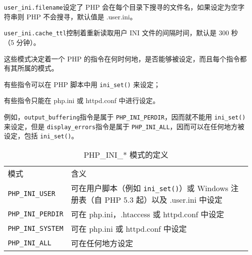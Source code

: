 \begin{compactitem}
\item \texttt{user\_ini.filename}设定了 PHP 会在每个目录下搜寻的文件名，如果设定为空字符串则 PHP 不会搜寻，默认值是 .user.ini。

\item \texttt{user\_ini.cache\_ttl}控制着重新读取用户 INI 文件的间隔时间，默认是 300 秒（5 分钟）。
\end{compactitem}

这些模式决定着一个 PHP 的指令在何时何地，是否能够被设定，而且每个指令都有其所属的模式。

\begin{compactitem}
\item 有些指令可以在 PHP 脚本中用 \texttt{ini\_set()} 来设定；
\item 有些指令只能在 php.ini 或 httpd.conf 中进行设定。
\end{compactitem}

例如，\texttt{output\_buffering}指令是属于 \texttt{PHP\_INI\_PERDIR}，因而就不能用 \texttt{ini\_set()}来设定，但是 \texttt{display\_errors}指令是属于 \texttt{PHP\_INI\_ALL}，因而可以在任何地方被设定，包括 \texttt{ini\_set()}。



\begin{table}[htbp]
\centering
\caption{PHP\_INI\_* 模式的定义}
\label{php_ini_*}
\begin{tabular}{m{80pt}m{280pt}}
\hline
模式						&含义\\
\texttt{PHP\_INI\_USER}	 &可在用户脚本（例如 \texttt{ini\_set()}）或 Windows 注册表（自 PHP 5.3 起）以及 .user.ini 中设定\\
\texttt{PHP\_INI\_PERDIR}	&可在 php.ini，.htaccess 或 httpd.conf 中设定\\
\texttt{PHP\_INI\_SYSTEM}	&可在 php.ini 或 httpd.conf 中设定\\
\texttt{PHP\_INI\_ALL}		&可在任何地方设定\\
\end{tabular}
\end{table}


